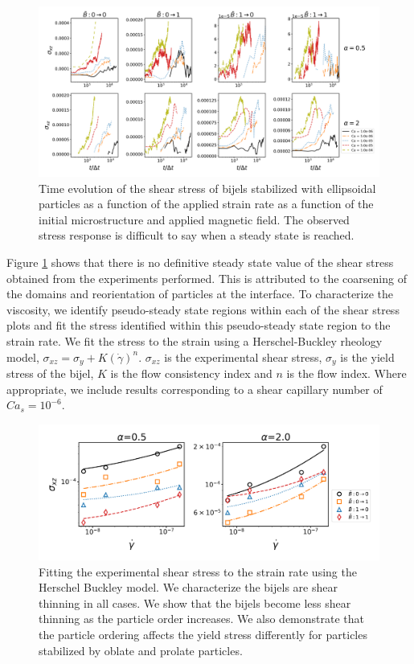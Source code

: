 \begin{figure} 
    \centering 
    \includegraphics[scale=0.3]{../figures/results/paper3/stress-time_compare.png} 
    \caption{Time evolution of the shear stress of bijels stabilized with ellipsoidal particles as a function of the applied strain rate as
             a function of the initial microstructure and applied magnetic field. The observed stress response is difficult to say when a steady
             state is reached.} 
    \label{fig:stress_time} 
\end{figure}

Figure \ref{fig:stress_time} shows that there is no definitive steady state value of the shear stress obtained from the experiments performed. This is
attributed to the coarsening of the domains and reorientation of particles at the interface. To characterize the viscosity, we identify pseudo-steady
state regions within each of the shear stress plots and fit the stress identified within this pseudo-steady state region to the strain rate. We fit 
the stress to the strain using a Herschel-Buckley rheology model, $\sigma_{xz} = \sigma_{y} + K(\dot{\gamma})^{n}$. $\sigma_{xz}$ is the experimental
shear stress, $\sigma_{y}$ is the yield stress of the bijel, $K$ is the flow consistency index and $n$ is the flow index.
Where appropriate, we include results corresponding to a shear capillary number of $Ca_s = 10^{-6}$.

\begin{figure} 
    \centering 
    \includegraphics[scale=0.4]{../figures/results/paper3/stress_strain-all.png} 
    \caption{Fitting the experimental shear stress to the strain rate using the Herschel Buckley model. We characterize the bijels are 
             shear thinning in all cases. We show that the bijels become less shear thinning as the particle order increases. We also
             demonstrate that the particle ordering affects the yield stress differently for particles stabilized by oblate and 
             prolate particles.} 
    \label{fig:stress_strain} 
\end{figure}

